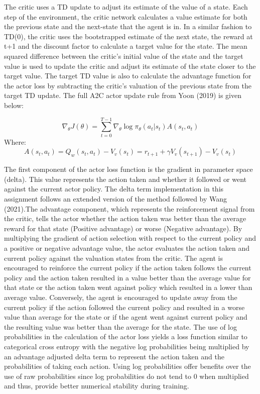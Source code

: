 \documentclass{article}
\begin{document}
The critic uses a TD update to adjust its estimate of the value of a state. Each step of the environment, the critic network calculates a value estimate for both the previous state and the next-state that the agent is in. In a similar fashion to TD(0), the critic uses the bootstrapped estimate of the next state, the reward at t+1 and the discount factor to calculate a target value for the state. The mean squared difference between the critic's initial value of the state and the target value is used to update the critic and adjust its estimate of the state closer to the target value. The target TD value is also to calculate the advantage function for the actor loss by subtracting the critic's valuation of the previous state from the target TD update. The full A2C actor update rule from Yoon (2019) is given below: 

\begin{equation}
\nabla_{\theta} J(\theta) = \sum_{t=0}^{T-1}\nabla_{\theta}\log{\pi_{\theta}}(a_{t} | s_{t}) A(s_{t}, a_{t})
\end{equation}
Where:
\begin{equation}
A(s_{t}, a_{t}) = Q_{w}(s_{t}, a_{t}) - V_{v}(s_{t}) = r_{t+1} + \gamma V_{v}(s_{t+1}) - V_{v}(s_{t})
\end{equation}

The first component of the actor loss function is the gradient in parameter space (delta). This value represents the action taken and whether it followed or went against the current actor policy. The delta term implementation in this assignment follows an extended version of the method followed by Wang (2021).The advantage component, which represents the reinforcement signal from the critic, tells the actor whether the action taken was better than the average reward for that state (Positive advantage) or worse (Negative advantage). By multiplying the gradient of action selection with respect to the current policy and a positive or negative advantage value, the actor evaluates the action taken and current policy against the valuation states from the critic. The agent is encouraged to reinforce the current policy if the action taken follows the current policy and the action taken resulted in a value better than the average value for that state or the action taken went against policy which resulted in a lower than average value. Conversely, the agent is encouraged to update away from the current policy if the action followed the current policy and resulted in a worse value than average for the state or if the agent went against current policy and the resulting value was better than the average for the state. The use of log probabilities in the calculation of the actor loss yields a loss function similar to categorical cross entropy with the negative log probabilities being multiplied by an advantage adjusted delta term to represent the action taken and the probabilities of taking each action. Using log probabilities offer benefits over the use of raw probabilities since log probabilities do not tend to 0 when multiplied and thus, provide better numerical stability during training.
\end{document}
